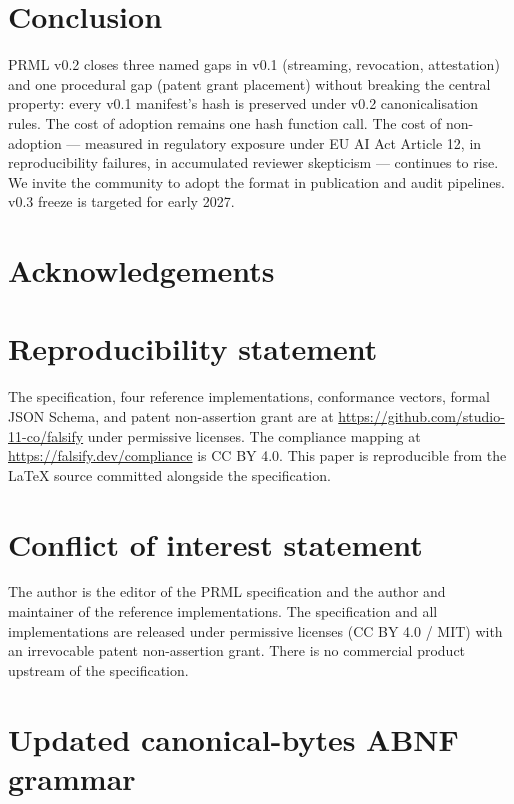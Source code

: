 \documentclass[11pt, a4paper]{article}
\begin{document}
\section{Conclusion}
\label{sec:conclusion}

PRML v0.2 closes three named gaps in v0.1 (streaming, revocation, attestation) and one procedural gap (patent grant placement) without breaking the central property: every v0.1 manifest's hash is preserved under v0.2 canonicalisation rules. The cost of adoption remains one hash function call. The cost of non-adoption --- measured in regulatory exposure under EU AI Act Article 12, in reproducibility failures, in accumulated reviewer skepticism --- continues to rise. We invite the community to adopt the format in publication and audit pipelines. v0.3 freeze is targeted for early 2027.

\section*{Acknowledgements}


\section*{Reproducibility statement}

The specification, four reference implementations, conformance vectors, formal JSON Schema, and patent non-assertion grant are at \url{https://github.com/studio-11-co/falsify} under permissive licenses. The compliance mapping at \url{https://falsify.dev/compliance} is CC BY 4.0. This paper is reproducible from the LaTeX source committed alongside the specification.

\section*{Conflict of interest statement}

The author is the editor of the PRML specification and the author and maintainer of the reference implementations. The specification and all implementations are released under permissive licenses (CC BY 4.0 / MIT) with an irrevocable patent non-assertion grant. There is no commercial product upstream of the specification.

\appendix

\section{Updated canonical-bytes ABNF grammar}
\label{app:abnf}
\end{document}
